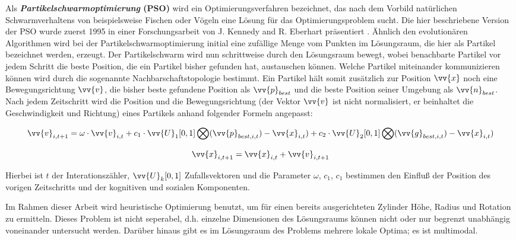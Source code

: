 Als \textbf{\textit{Partikelschwarmoptimierung} (PSO)} wird ein Optimierungsverfahren bezeichnet, das nach dem Vorbild nat\"urlichen Schwarmverhaltens von beispielsweise Fischen oder V\"ogeln eine L\"osung f\"ur das Optimierungsproblem sucht. Die hier beschriebene Version der PSO wurde zuerst 1995 in einer Forschungsarbeit von J. Kennedy and R. Eberhart präsentiert \cite{kennedyPSOConfPaper}. \"Ahnlich den evolution\"aren Algorithmen wird bei der Partikelschwarmoptimierung initial eine zuf\"allige  Menge vom Punkten im L\"osungsraum, die hier als Partikel bezeichnet werden, erzeugt. Der Partikelschwarm wird nun schrittweise durch den L\"osungsraum bewegt, wobei benachbarte Partikel vor jedem Schritt die beste Position, die ein Partikel bisher gefunden hat, austauschen k\"onnen. Welche Partikel miteinander kommunizieren k\"onnen wird durch die sogenannte Nachbarschaftstopologie bestimmt. 
Ein Partikel h\"alt somit zus\"atzlich zur Position $\vv{x}$ noch eine Bewegungsrichtung $\vv{v}$, die bisher beste gefundene Position als $\vv{p}_{best}$ und die beste Position seiner Umgebung als $\vv{n}_{best}$. Nach jedem Zeitschritt wird die Position und die Bewegungsrichtung (der Vektor $\vv{v}$ ist nicht normalisiert, er beinhaltet die Geschwindigkeit und Richtung) eines Partikels anhand folgender Formeln angepasst:

\begin{equation}
\vv{v}_{i,t+1} = \omega\cdot\vv{v}_{i,t}+c_{1}\cdot\vv{U}_{1}[0,1]\bigotimes(\vv{p}_{best,i,t})-\vv{x}_{i,t})
+c_{2}\cdot\vv{U}_{2}[0,1]\bigotimes(\vv{g}_{best,i,t})-\vv{x}_{i,t})
\end{equation}

\begin{equation}
\vv{x}_{i,t+1} = \vv{x}_{i,t} + \vv{v}_{i,t+1}
\end{equation}

Hierbei ist $t$ der Interationsz\"ahler, $\vv{U}_{k}[0,1]$ Zufallsvektoren und die Parameter $\omega$, $c_{1}$, $c_{1}$ bestimmen den Einflu{\ss}  der Position des vorigen Zeitschritts und der kognitiven und sozialen Komponenten.

Im Rahmen dieser Arbeit wird heuristische Optimierung benutzt, um f\"ur einen bereits ausgerichteten Zylinder H\"ohe, Radius und Rotation zu ermitteln. Dieses Problem ist nicht seperabel, d.h. einzelne Dimensionen des L\"osungsraums k\"onnen nicht oder nur begrenzt unabh\"angig voneinander untersucht werden. Dar\"uber hinaus gibt es im L\"osungsraum des Problems mehrere lokale Optima; es ist multimodal.

